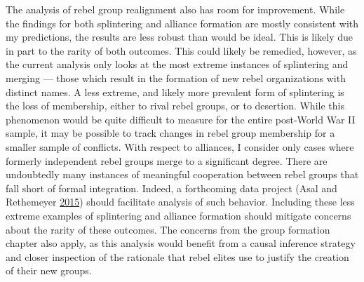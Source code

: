 \documentclass[12pt,]{book}
\theoremstyle{definition}
\theoremstyle{definition}
\theoremstyle{remark}
\begin{document}
The analysis of rebel group realignment also has room for improvement.
While the findings for both splintering and alliance formation are
mostly consistent with my predictions, the results are less robust than
would be ideal. This is likely due in part to the rarity of both
outcomes. This could likely be remedied, however, as the current
analysis only looks at the most extreme instances of splintering and
merging --- those which result in the formation of new rebel
organizations with distinct names. A less extreme, and likely more
prevalent form of splintering is the loss of membership, either to rival
rebel groups, or to desertion. While this phenomenon would be quite
difficult to measure for the entire post-World War II sample, it may be
possible to track changes in rebel group membership for a smaller sample
of conflicts. With respect to alliances, I consider only cases where
formerly independent rebel groups merge to a significant degree. There
are undoubtedly many instances of meaningful cooperation between rebel
groups that fall short of formal integration. Indeed, a forthcoming data
project (Asal and Rethemeyer \protect\hyperlink{ref-Asal2015}{2015})
should facilitate analysis of such behavior. Including these less
extreme examples of splintering and alliance formation should mitigate
concerns about the rarity of these outcomes. The concerns from the group
formation chapter also apply, as this analysis would benefit from a
causal inference strategy and closer inspection of the rationale that
rebel elites use to justify the creation of their new groups.
\end{document}
